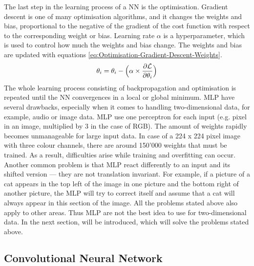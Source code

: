 The last step in the learning process of a \gls{NN} is the optimisation. Gradient descent is one of many optimisation algorithms, and it changes the weights and bias, proportional to the negative of the gradient of the cost function with respect to the corresponding weight or bias. Learning rate $\alpha$ is a hyperparameter, which is used to control how much the weights and bias change. The weights and bias are updated with equations \ref{eq:Optimisation-Gradient-Descent-Weights}.
\begin{equation}
    \centering
    \theta_i = \theta_i - \Big(\alpha \times \frac{\partial \mathcal{L}}{\partial\theta_i}\Big)
    \label{eq:Optimisation-Gradient-Descent-Weights}
\end{equation}
The whole learning process consisting of backpropagation and optimisation is repeated until the \gls{NN} convergences in a local or global minimum.
\newline
\newline
\gls{MLP} have several drawbacks, especially when it comes to handling two-dimensional data, for example, audio or image data. \gls{MLP} use one perceptron for each input (e.g. pixel in an image, multiplied by 3 in the case of RGB). The amount of weights rapidly becomes unmanageable for large input data. In case of a 224 x 224 pixel image with three colour channels, there are around 150'000 weights that must be trained. As a result, difficulties arise while training and overfitting can occur. Another common problem is that \gls{MLP} react differently to an input and its shifted version — they are not translation invariant. For example, if a picture of a cat appears in the top left of the image in one picture and the bottom right of another picture, the \gls{MLP} will try to correct itself and assume that a cat will always appear in this section of the image. All the problems stated above also apply to other areas. Thus \gls{MLP} are not the best idea to use for two-dimensional data. In the next section,  will be introduced, which will solve the problems stated above.

\subsection{Convolutional Neural Network}
\label{sub:Convolutional-Neural-Network}

